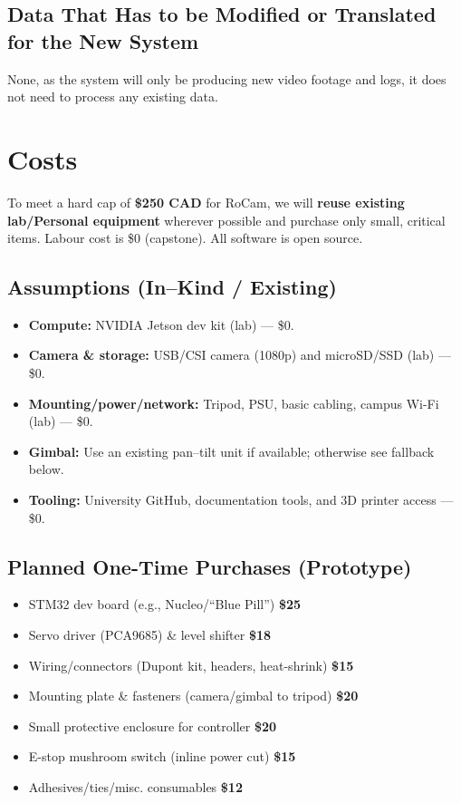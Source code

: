\documentclass[12pt]{article}
\begin{document}
\subsection{Data That Has to be Modified or Translated for the New System}

None, as the system will only be producing new video footage and logs, it does
not need to process any existing data.

\section{Costs}
\label{sec:costs}

To meet a hard cap of \textbf{\$250 CAD} for RoCam, we will \textbf{reuse
  existing lab/Personal equipment} wherever possible and purchase only small,
critical items. Labour cost is \$0 (capstone). All software is open source.

\subsection*{Assumptions (In–Kind / Existing)}
\begin{itemize}
  \item \textbf{Compute:} NVIDIA Jetson dev kit (lab) — \$0.
  \item \textbf{Camera \& storage:} USB/CSI camera (1080p) and microSD/SSD (lab) — \$0.
  \item \textbf{Mounting/power/network:} Tripod, PSU, basic cabling, campus Wi-Fi (lab) — \$0.
  \item \textbf{Gimbal:} Use an existing pan–tilt unit if available; otherwise see fallback below.
  \item \textbf{Tooling:} University GitHub, documentation tools, and 3D printer access — \$0.
\end{itemize}

\subsection*{Planned One-Time Purchases (Prototype)}
\begin{itemize}
  \item STM32 dev board (e.g., Nucleo/“Blue Pill”) \dotfill \textbf{\$25}
  \item Servo driver (PCA9685) \& level shifter \dotfill \textbf{\$18}
  \item Wiring/connectors (Dupont kit, headers, heat-shrink) \dotfill \textbf{\$15}
  \item Mounting plate \& fasteners (camera/gimbal to tripod) \dotfill \textbf{\$20}
  \item Small protective enclosure for controller \dotfill \textbf{\$20}
  \item E-stop mushroom switch (inline power cut) \dotfill \textbf{\$15}
  \item Adhesives/ties/misc. consumables \dotfill \textbf{\$12}
\end{itemize}
\end{document}
